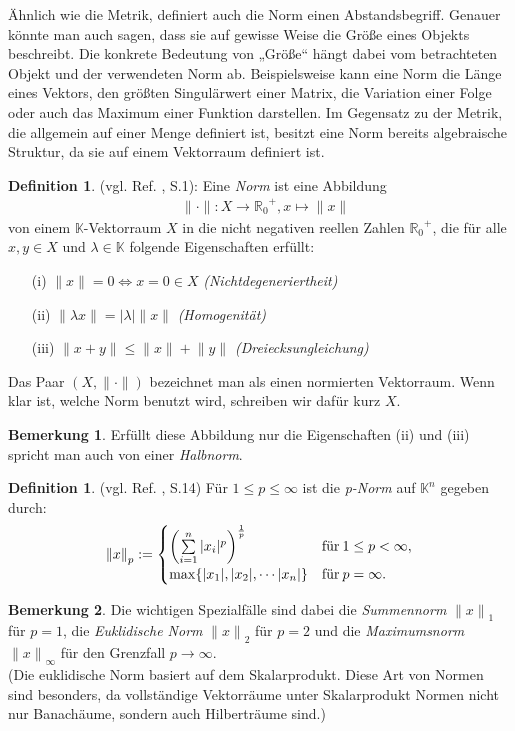 \documentclass[10pt,a4paper]{article}
\theoremstyle{plain}
\theoremstyle{definition}
\newtheorem{definition}[satz]{Definition}
\newenvironment{dfi}{\begin{shaded}\begin{definition}}{\end{definition}\end{shaded}}
\theoremstyle{nonumberplain}
\newtheorem{bemerkung}{Bemerkung}
\newenvironment{bem}{\begin{bemerkung}}{\end{bemerkung}}
\newcommand{\R}{\mathbb{R}}
\newcommand{\K}{\mathbb{K}}
\begin{document}
Ähnlich wie die Metrik, definiert auch die Norm einen Abstandsbegriff. Genauer könnte man auch sagen, dass sie auf gewisse Weise die Größe eines Objekts beschreibt. Die konkrete Bedeutung von „Größe“ hängt dabei vom betrachteten Objekt und der verwendeten Norm ab. Beispielsweise kann eine Norm die Länge eines Vektors, den größten Singulärwert einer Matrix, die Variation einer Folge oder auch das Maximum einer Funktion darstellen. Im Gegensatz zu der Metrik, die allgemein auf einer Menge definiert ist, besitzt eine Norm bereits algebraische Struktur, da sie auf einem Vektorraum definiert ist. 
\begin{dfi}
(vgl. Ref. \cite{Werner}, S.1):
Eine \textit{Norm} ist eine Abbildung 
\begin{align*}
 & {\|\cdot\|} : X \rightarrow {\R_0}^+, x \mapsto \|x\|
\end{align*}
von einem $\K$-Vektorraum $X$ in die nicht negativen reellen Zahlen ${\R_0}^+$, die für alle $x, y \in X$ und $\lambda \in \K$ folgende Eigenschaften erfüllt:
\begin{itemize}
\item[(i)] ${\|x\|} = 0 \Leftrightarrow x = 0 \in X$ \textit{(Nichtdegeneriertheit)}
\item[(ii)] ${\|\lambda x\|} = |\lambda|{\|x\|}$ \textit{(Homogenität)}
\item[(iii)] ${\|x + y\|} \leq {\|x\|} + {\|y\|}$ \textit{(Dreiecksungleichung)}
\end{itemize}
Das Paar $(X , {\|\cdot\|})$ bezeichnet man als einen normierten Vektorraum. Wenn klar ist, welche Norm benutzt wird, schreiben wir dafür kurz $X$.
\end{dfi}
\begin{bem}
Erfüllt diese Abbildung nur die Eigenschaften (ii) und (iii) spricht man auch von einer \textit{Halbnorm}.
\end{bem}
\begin{dfi}
(vgl. Ref. \cite{Alt}, S.14) Für $1 \leq p \leq \infty$ ist die \textit{p-Norm} auf $\K^n$ gegeben durch:
\begin{align}
{\|x\|}_p := 
\begin{cases}
\left(\sum\limits_{i=1}^n{|x_i|^p}\right)^{1 \over p} & \text{für} \: 1 \leq p < \infty,\\
\max\{|x_1|, |x_2|, \cdots |x_n|\} & \text{für} \:  p = \infty.
\end{cases}
\end{align}
\end{dfi}
\begin{bem}
Die wichtigen Spezialfälle sind dabei die \textit{Summennorm} ${\|x\|}_1$ für $p = 1$, die \textit{Euklidische Norm} ${\|x\|}_2$ für $p = 2$ und die \textit{Maximumsnorm} ${\|x\|}_\infty$ für den Grenzfall $p \rightarrow \infty$.\\
(Die euklidische Norm basiert auf dem Skalarprodukt. Diese Art von Normen sind besonders, da vollständige Vektorräume unter Skalarprodukt Normen nicht nur Banachäume, sondern auch Hilberträume sind.)
\end{bem}
\end{document}
